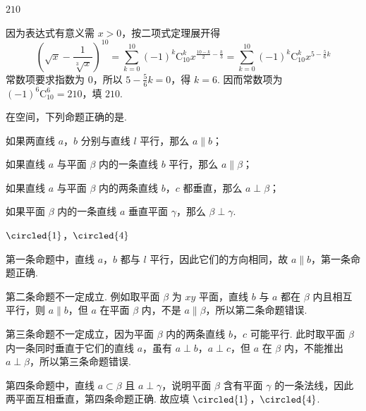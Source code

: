 \begin{answer}
\(210\)
\end{answer}

\begin{solution}
因为表达式有意义需 \(x>0\)，按二项式定理展开得
\[\left(\sqrt{x}-\frac1{\sqrt[3]{x}}\right)^{10}=\sum_{k=0}^{10}(-1)^k\mathrm C_{10}^k x^{\frac{10-k}{2}-\frac{k}{3}}=\sum_{k=0}^{10}(-1)^k\mathrm C_{10}^k x^{5-\frac56k}
\]
常数项要求指数为 \(0\)，所以 \(5-\frac56k=0\)，得 \(k=6\). 因而常数项为 \((-1)^6\mathrm C_{10}^6=210\)，填 \(210\).
\end{solution}

\begin{problem}
在空间，下列命题正确的是\fillinblank{}.

\begin{circlelist}
\item 如果两直线 \(a\)，\(b\) 分别与直线 \(l\) 平行，那么 \(a \parallel b\)；
\item 如果直线 \(a\) 与平面 \(\beta\) 内的一条直线 \(b\) 平行，那么 \(a \parallel \beta\)；
\item 如果直线 \(a\) 与平面 \(\beta\) 内的两条直线 \(b\)，\(c\) 都垂直，那么 \(a \perp \beta\)；
\item 如果平面 \(\beta\) 内的一条直线 \(a\) 垂直平面 \(\gamma\)，那么 \(\beta \perp \gamma\).
\end{circlelist}
\end{problem}

\begin{answer}
\(\circled{1}\)，\(\circled{4}\)
\end{answer}

\begin{solution}
第一条命题中，直线 \(a\)，\(b\) 都与 \(l\) 平行，因此它们的方向相同，故 \(a\parallel b\)，第一条命题正确.

第二条命题不一定成立. 例如取平面 \(\beta\) 为 \(xy\) 平面，直线 \(b\) 与 \(a\) 都在 \(\beta\) 内且相互平行，则 \(a\parallel b\)，但 \(a\) 在平面 \(\beta\) 内，不是 \(a\parallel\beta\)，所以第二条命题错误.

第三条命题不一定成立，因为平面 \(\beta\) 内的两条直线 \(b\)，\(c\) 可能平行. 此时取平面 \(\beta\) 内一条同时垂直于它们的直线 \(a\)，虽有 \(a\perp b\)，\(a\perp c\)，但 \(a\) 在 \(\beta\) 内，不能推出 \(a\perp\beta\)，所以第三条命题错误.

第四条命题中，直线 \(a\subset\beta\) 且 \(a\perp\gamma\)，说明平面 \(\beta\) 含有平面 \(\gamma\) 的一条法线，因此两平面互相垂直，第四条命题正确. 故应填 \(\circled{1}\)，\(\circled{4}\).
\end{solution}

